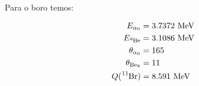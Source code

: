 \documentclass{article}
\begin{document}
\begin{multicols}{2}
\paragraph*{} Para o boro temos:

\begin{equation}
\begin{split}
  E_{\alpha_0} &= 3.7372 \text{ MeV} \\
  E_{\ce{^8Be}} &= 3.1086 \text{ MeV} \\
  \theta_{\alpha_0} &= 165 \\
  \theta_{\ce{Be8}} &= 11 \\
  Q (\ce{^11Br}) &= 8.591 \text{ MeV} \\
\end{split}
\label{eq:energiesBr}
\end{equation}




\printbibliography
\nocite{*}

\end{multicols}
\end{document}
